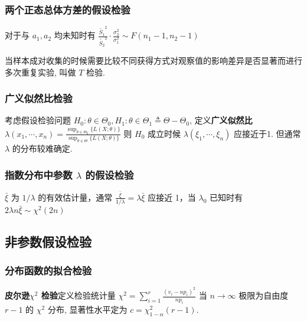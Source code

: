 \documentclass[10pt]{yerbaformat}
\begin{document}
\subsubsection{两个正态总体方差的假设检验}

\par 对于与 $a_{1}, a_{2}$ 均未知时有 $\frac{\widetilde{S_{1}}^{2}}{\widetilde{S_{2}}^{2}} \cdot \frac{\sigma_{2}^{2}}{\sigma_{1}^{2}} \sim F\left(n_{1}-1, n_{2}-1\right)$

\begin{definition}[$T$ 检验]
    当样本成对收集的时候需要比较不同获得方式对观察值的影响差异是否显著而进行多次重复实验, 叫做 $T$ 检验.
\end{definition}

\subsubsection{广义似然比检验}

\par 考虑假设检验问题 $H_{0}: \theta \in \Theta_{0}, H_{1}: \theta \in \Theta_{1} \triangleq \Theta-\Theta_{0}$, 定义\textbf{广义似然比} $\lambda\left(x_{1}, \cdots, x_{n}\right)=\frac{\sup _{\theta \in \Theta_{0}}\{L(X ; \theta)\}}{\sup _{\theta \in \Theta}\{L(X ; \theta)\}}$ 则 $H_{0}$ 成立时候 $\lambda\left(\xi_{1}, \cdots, \xi_{n}\right)$ 应接近于1. 但通常 $\lambda$ 的分布较难确定.

\subsubsection{指数分布中参数 $\lambda$ 的假设检验}

\par $\bar{\xi}$ 为 $1 / \lambda$ 的有效估计量，通常 $\frac{\bar{\xi}}{1 / \lambda}=\lambda \bar{\xi}$ 应接近 1，当 $\lambda_{0}$ 已知时有 $2 \lambda n \bar{\xi} \sim \chi^{2}(2 n)$ 

\subsection{非参数假设检验}

\subsubsection{分布函数的拟合检验}

\par \textbf{皮尔逊$\chi^{2}$ 检验}定义检验统计量 $\chi^{2}=\sum_{i=1}^{r} \frac{\left(v_{i}-n p_{i}\right)^{2}}{n p_{i}}$ 当 $n \rightarrow \infty$ 极限为自由度 $r-1$ 的 $\chi^2$ 分布, 显著性水平定为 $c=\chi_{1-\alpha}^{2}(r-1)$.
\end{document}
